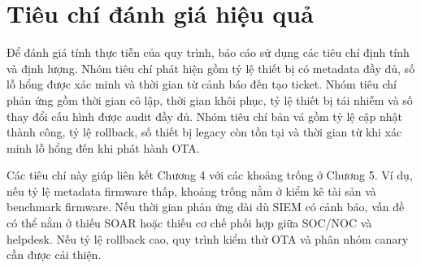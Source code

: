 \documentclass[../DoAn.tex]{subfiles}
\begin{document}
\section{Tiêu chí đánh giá hiệu quả}
Để đánh giá tính thực tiễn của quy trình, báo cáo sử dụng các tiêu chí định tính và định lượng. Nhóm tiêu chí phát hiện gồm tỷ lệ thiết bị có metadata đầy đủ, số lỗ hổng được xác minh và thời gian từ cảnh báo đến tạo ticket. Nhóm tiêu chí phản ứng gồm thời gian cô lập, thời gian khôi phục, tỷ lệ thiết bị tái nhiễm và số thay đổi cấu hình được audit đầy đủ. Nhóm tiêu chí bản vá gồm tỷ lệ cập nhật thành công, tỷ lệ rollback, số thiết bị legacy còn tồn tại và thời gian từ khi xác minh lỗ hổng đến khi phát hành OTA.

Các tiêu chí này giúp liên kết Chương 4 với các khoảng trống ở Chương 5. Ví dụ, nếu tỷ lệ metadata firmware thấp, khoảng trống nằm ở kiểm kê tài sản và benchmark firmware. Nếu thời gian phản ứng dài dù SIEM có cảnh báo, vấn đề có thể nằm ở thiếu SOAR hoặc thiếu cơ chế phối hợp giữa SOC/NOC và helpdesk. Nếu tỷ lệ rollback cao, quy trình kiểm thử OTA và phân nhóm canary cần được cải thiện.
\end{document}
